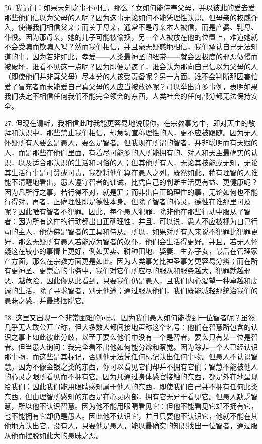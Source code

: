 26. 我请问：如果未知之事不可信，那么子女如何能侍奉父母，并以彼此的爱去爱那些他们信以为父母的人呢？因为这事无论如何不能凭理性认识。但母亲的权威介入，使得我们相信父亲；而关于母亲，通常不是母亲本人被信，而是产婆、乳母、仆役。因为那母亲，她的儿子可能被偷换，另一个人被放在他的位置上，难道她就不会受骗而欺骗人吗？然而我们相信，并且毫无疑惑地相信，我们承认自己无法知道的事。因为若非如此，孝爱——人类最神圣的纽带——就会因极度的邪恶傲慢而被破坏，谁看不见这一点呢？因为即便是疯子，谁会认为那向自己信以为父母的人（即使他们并非真父母）尽本分的人该受责备呢？另一方面，谁不会判断那因害怕爱了冒充者而未能爱自己真父母的人应当被放逐呢？可以举出许多事例，表明如果我们决定不相信任何我们不能完全领会的东西，人类社会的任何部分都无法保持安全。\par

27. 但现在请听，我相信此时我能更容易地说服你。在宗教事务中，即对天主的敬拜和认识中，那些禁止我们相信，却急切宣称理性的人，更不应被跟随。因为无人怀疑所有人要么是愚人，要么是智者。但我现在所谓的智者，并非聪明而有天赋的人，而是那些在他们里面，有着尽可能多的人所能拥有的、对人和天主最确实的认识，以及适合那认识的生活和习俗的人；但其他所有人，无论其技能或无知，无论其生活行事是可赞或可责，我都将他们算在愚人之列。既然如此，稍有理智的人谁能不清醒地看出，愚人遵守智者的训诫，比凭自己的判断生活更有益、更健康呢？因为凡所行之事，若行得不对，就是罪；而非出自正确理性的事，无论如何也不能行得对。再者，正确理性即是德性本身。但除了智者的心灵，德性在谁那里可及呢？因此唯有智者不犯罪。因此，每个愚人犯罪，除非他在那些行动中服从了智者：因为所有这样的行动都出自正确理性，并且，可以说，愚人不应被视为自己行动的主人，他仿佛是智者的工具和侍从。所以，如果对所有人来说不犯罪比犯罪更好，那么无疑所有愚人若能成为智者的奴仆，他们会生活得更好。并且，若无人怀疑这在较小的事情上更好，例如买卖、耕种田地、娶妻、生养子女，最后在管理家产方面，那么在宗教方面更是如此。因为人类事务比神圣事务更容易分辨；而在所有更神圣、更崇高的事务中，我们对它们所应尽的服从和服务越大，犯罪就越邪恶、越危险。因此你从此看到，只要我们仍是愚人，且我们内心渴望一种卓越和虔诚的生活，除了寻求智者，别无他途；通过服从他们，我们既能减轻那统治我们的愚昧之感，并最终摆脱它。\par

28. 这里又出现一个非常困难的问题。因为我们愚人如何能找到一位智者呢？虽然几乎无人敢公开宣称，但大多数人都间接地声称这个名号：他们在智慧所包含的认识之事上如此彼此分歧，以至于要么他们中没有一个是智者，要么只有某一位是智者。但当愚人询问：\newline{}我完全看不出他如何能分辨和察觉。因为除非一个人已经认识那事物，而这些是其标记，否则他无法凭任何标记认出任何事物。但愚人不认识智慧。因为不像金银之类的东西，你可以看见它们却并不拥有它们；智慧不能被他人的心灵之眼所看见而不拥有它。因为凡通过身体感官接触的东西，都是外在地呈现给我们；因此我们能用眼睛感知属于他人的东西，即使我们自己并不拥有任何此类东西。但由理智所感知的东西是在心灵内部，拥有它无异于看见它。但愚人缺乏智慧，所以他不认识智慧。因为他不能用眼睛看见它：但他不能看见它却不拥有它，也不能拥有它却仍是愚人。因此他不认识它，并且只要他不认识它，他就不能在其他地方认出它。没有人，只要他是愚人，能以最确实的知识找出一位智者，通过服从他而摆脱如此大的愚昧之恶。\par

